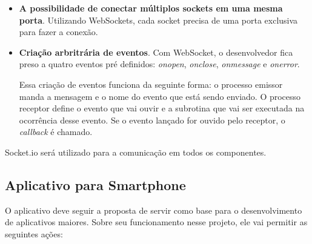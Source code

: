 \documentclass[a4paper,12pt]{article}
\begin{document}
\begin{itemize}

\item \textbf{A possibilidade de conectar múltiplos sockets em uma mesma porta}. Utilizando WebSockets, cada socket precisa de uma porta exclusiva para fazer a conexão.

\item \textbf{Criação arbritrária de eventos}. Com WebSocket, o desenvolvedor fica preso a quatro eventos pré definidos: \emph{onopen}, \emph{onclose}, \emph{onmessage} e \emph{onerror}.

Essa criação de eventos funciona da seguinte forma: o processo emissor manda a mensagem e o nome do evento que está sendo enviado. O processo receptor define o evento que vai ouvir e a subrotina que vai ser executada na ocorrência desse evento. Se o evento lançado for ouvido pelo receptor, o \emph{callback} é chamado.
\end{itemize}

Socket.io será utilizado para a comunicação em todos os componentes.%



\subsection{Aplicativo para Smartphone}

O aplicativo deve seguir a proposta de servir como base para o desenvolvimento de aplicativos maiores. Sobre seu funcionamento nesse projeto, ele vai permitir as seguintes ações:
\end{document}

